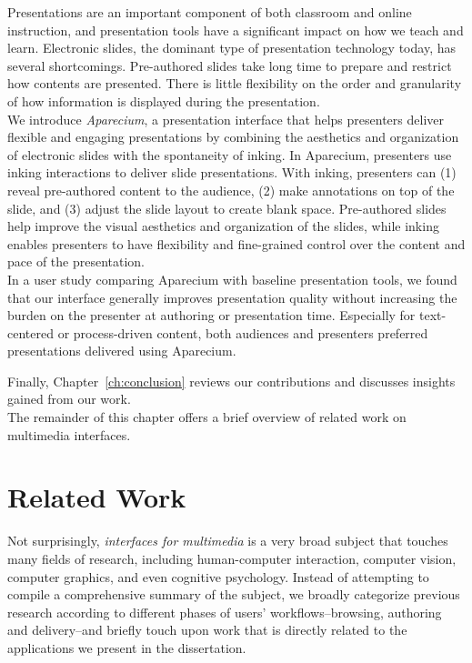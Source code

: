 \begin{mldescription}
%
Presentations are an important component of both classroom
and online instruction, and presentation tools have a significant impact on how we teach and learn. Electronic slides, the dominant type of presentation technology today, has several shortcomings. Pre-authored slides take long time to prepare and restrict how contents are presented. There is little flexibility on the order and granularity of how information is displayed during the presentation.\\
We introduce \emph{Aparecium}, a presentation interface that helps presenters deliver flexible and engaging presentations by combining
the aesthetics and organization of electronic slides with
the spontaneity of inking. In Aparecium, presenters use inking
interactions to deliver slide presentations. With inking, presenters
can (1) reveal pre-authored content to the audience,
(2) make annotations on top of the slide, and (3) adjust the
slide layout to create blank space. Pre-authored slides help improve
the visual aesthetics and organization of the slides, while
inking enables presenters to have flexibility and fine-grained
control over the content and pace of the presentation.\\
In a user study comparing Aparecium with baseline presentation
tools, we found that our interface generally improves presentation
quality without increasing the burden on the presenter
at authoring or presentation time. Especially for text-centered
or process-driven content, both audiences and presenters preferred
presentations delivered using Aparecium.

\end{mldescription}
Finally, Chapter~\ref{ch:conclusion} reviews our contributions and discusses insights gained from our work. \\
The remainder of this chapter offers a brief overview of related work on multimedia interfaces.  

\section{Related Work}
Not surprisingly, \emph{interfaces for multimedia} is a very broad subject that touches many fields of research, including human-computer interaction, computer vision, computer graphics, and even cognitive psychology. Instead of attempting to compile a comprehensive summary of the subject, we broadly categorize previous research according to different phases of users' workflows--browsing, authoring and delivery--and briefly touch upon work that is directly related to the applications we present in the dissertation. 

